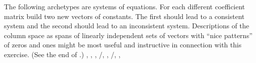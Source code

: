 The following archetypes are systems of equations.  For each different coefficient matrix build two new vectors of constants.  The first should lead to a consistent system and the second should lead to an inconsistent system.  Descriptions of the column space as spans of linearly independent sets of vectors with ``nice patterns'' of zeros and ones might be most useful and instructive in connection with this exercise. (See the end of .)\newline\newline
{},
,
,
/,
,
/,
,


